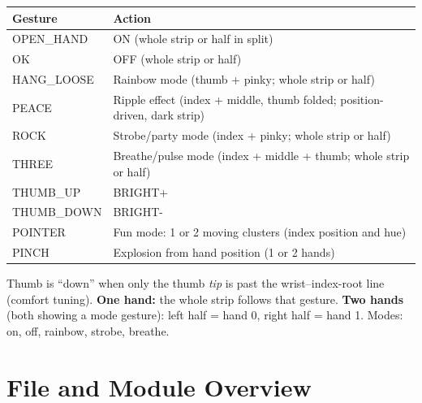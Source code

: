 \documentclass[a4paper,12pt]{article}
\begin{document}
\begin{center}
\begin{tabular}{@{}ll@{}}
\toprule
\textbf{Gesture} & \textbf{Action} \\ \midrule
OPEN\_HAND   & ON (whole strip or half in split) \\
OK           & OFF (whole strip or half) \\
HANG\_LOOSE  & Rainbow mode (thumb + pinky; whole strip or half) \\
PEACE        & Ripple effect (index + middle, thumb folded; position-driven, dark strip) \\
ROCK         & Strobe/party mode (index + pinky; whole strip or half) \\
THREE        & Breathe/pulse mode (index + middle + thumb; whole strip or half) \\
THUMB\_UP    & BRIGHT+ \\
THUMB\_DOWN  & BRIGHT- \\
POINTER      & Fun mode: 1 or 2 moving clusters (index position and hue) \\
PINCH        & Explosion from hand position (1 or 2 hands) \\
\bottomrule
\end{tabular}
\end{center}
Thumb is ``down'' when only the thumb \emph{tip} is past the wrist--index-root line (comfort tuning). \textbf{One hand:} the whole strip follows that gesture. \textbf{Two hands} (both showing a mode gesture): left half = hand 0, right half = hand 1. Modes: on, off, rainbow, strobe, breathe.

\section{File and Module Overview}
\end{document}
